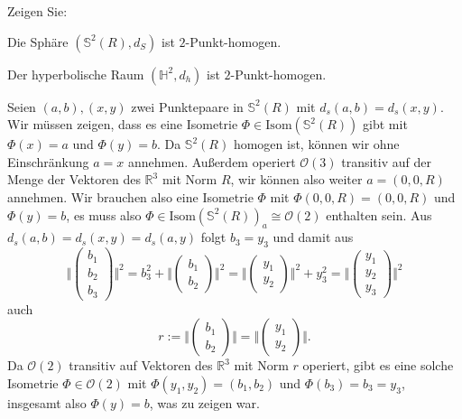 \documentclass[11pt]{book}
\numberwithin{dummy}{section}
\theoremstyle{nonumberbreak}
\newenvironment{prob}[1][]{\ifthenelse{\equal{#1}{}}{\problem}{\problem[#1]}\rm}{\endproblem}
\newenvironment{sol}[1][]{\ifthenelse{\equal{#1}{}}{\solution}{\solution[#1]}\rm}{\endsolution}
\newcommand{\R}{\mathbb{R}}
\newcommand{\Sph}{\mathbb{S}}
\newcommand{\He}{\mathbb{H}}
\begin{document}
\begin{spacing}{1.4}
\begin{prob}
\begin{sol}
\begin{compactenum}
\end{compactenum}
\end{sol}


\end{prob}



\begin{prob}   %
Zeigen Sie:
\begin{compactenum}
\item Die Sphäre $(\Sph^2(R), d_S)$ ist $2$-Punkt-homogen.
\item Der hyperbolische Raum $(\He^2, d_h)$ ist $2$-Punkt-homogen.
\end{compactenum}

\begin{sol}

\begin{compactenum}
\item Seien $(a,b), (x,y)$ zwei Punktepaare in $\Sph^2(R)$ mit $d_s(a,b)=d_s(x,y)$. Wir müssen zeigen, dass es eine Isometrie $\Phi\in \mathrm{Isom}(\Sph^2(R))$ gibt mit $\Phi(x)=a$ und $\Phi(y)=b$. Da $\Sph^2(R)$ homogen ist, können wir ohne Einschränkung $a=x$ annehmen. Außerdem operiert $\mathcal{O}(3)$ transitiv auf der Menge der Vektoren des $\R^3$ mit Norm $R$, wir können also weiter $a=(0,0,R)$ annehmen. Wir brauchen also eine Isometrie $\Phi$ mit $\Phi(0,0,R)=(0,0,R)$ und $\Phi(y)=b$, es muss also $\Phi \in \mathrm{Isom}(\Sph^2(R))_a \cong \mathcal{O}(2)$ enthalten sein. Aus $d_s(a,b)=d_s(x,y)=d_s(a,y)$ folgt $b_3=y_3$ und damit aus 
$$ \Bigg\Vert \begin{pmatrix} b_1\\[-6pt] b_2\\[-6pt] b_3\end{pmatrix}\Bigg\Vert^2 = b_3^2 + \Bigg \Vert \begin{pmatrix} b_1 \\[-6pt] b_2\end{pmatrix} \Bigg \Vert^2 = \Bigg \Vert \begin{pmatrix} y_1 \\[-6pt] y_2\end{pmatrix} \Bigg \Vert^2 + y_3^2  = \Bigg\Vert \begin{pmatrix} y_1\\[-6pt] y_2\\[-6pt] y_3\end{pmatrix}\Bigg\Vert^2  $$
auch $$r:=\Bigg \Vert \begin{pmatrix} b_1 \\[-6pt] b_2\end{pmatrix} \Bigg \Vert = \Bigg \Vert \begin{pmatrix} y_1 \\[-6pt] y_2\end{pmatrix} \Bigg \Vert.$$
Da $\mathcal{O}(2)$ transitiv auf Vektoren des $\R^3$ mit Norm $r$ operiert, gibt es eine solche Isometrie $\Phi \in \mathcal{O}(2)$ mit $\Phi(y_1,y_2)=(b_1,b_2)$ und $\Phi(b_3)=b_3=y_3$, insgesamt also $\Phi(y)=b$, was zu zeigen war.


\end{compactenum}
\end{sol}
\end{prob}
\end{spacing}
\end{document}
